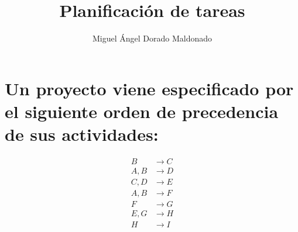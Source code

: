 \documentclass{llncs}
\begin{document}
\title{Planificación de tareas}

\author{Miguel Ángel Dorado Maldonado}

\maketitle

\vspace{1cm}

\section{Un proyecto viene especificado por el siguiente orden de precedencia de sus actividades:}

\begin{align*}
B &\longrightarrow C \\
A, B &\longrightarrow D \\
C, D &\longrightarrow E \\
A, B &\longrightarrow F \\
F &\longrightarrow G \\
E, G &\longrightarrow H \\
H &\longrightarrow I \\
\end{align*}
\end{document}
